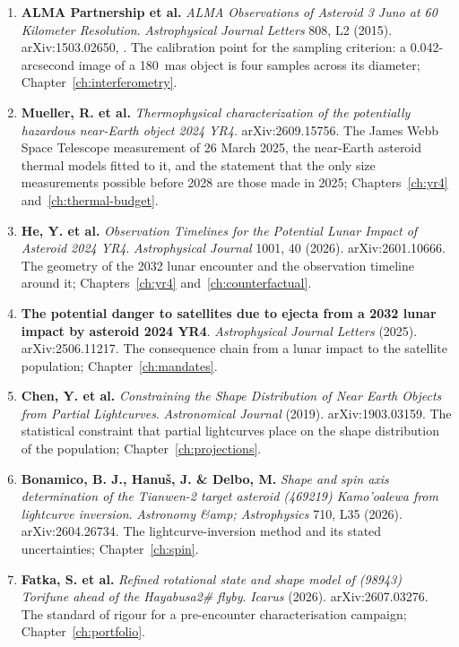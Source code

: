 \begin{enumerate}[leftmargin=2.9em,itemsep=4pt,resume]
\item \textbf{ALMA Partnership et al.} \emph{ALMA Observations of Asteroid
3 Juno at 60 Kilometer Resolution}. \emph{Astrophysical Journal Letters}
808, L2 (2015). arXiv:1503.02650, .
The calibration point for the sampling criterion: a 0.042-arcsecond image
of a 180~mas object is four samples across its diameter; Chapter~\ref{ch:interferometry}.

\item \textbf{Mueller, R. et al.} \emph{Thermophysical characterization of the
potentially hazardous near-Earth object 2024 YR4}. arXiv:2609.15756. The
James Webb Space Telescope measurement of 26 March 2025, the near-Earth
asteroid thermal models fitted to it, and the statement that the only size
measurements possible before 2028 are those made in 2025; Chapters~\ref{ch:yr4}
and~\ref{ch:thermal-budget}.

\item \textbf{He, Y. et al.} \emph{Observation Timelines for the Potential
Lunar Impact of Asteroid 2024 YR4}. \emph{Astrophysical Journal} 1001, 40
(2026). arXiv:2601.10666. The geometry of the 2032 lunar encounter and the
observation timeline around it; Chapters~\ref{ch:yr4} and~\ref{ch:counterfactual}.

\item \textbf{The potential danger to satellites due to ejecta from a 2032
lunar impact by asteroid 2024 YR4}. \emph{Astrophysical Journal Letters}
(2025). arXiv:2506.11217. The consequence chain from a lunar impact to the
satellite population; Chapter~\ref{ch:mandates}.

\item \textbf{Chen, Y. et al.} \emph{Constraining the Shape Distribution of
Near Earth Objects from Partial Lightcurves}. \emph{Astronomical Journal}
(2019). arXiv:1903.03159. The statistical constraint that partial lightcurves
place on the shape distribution of the population; Chapter~\ref{ch:projections}.

\item \textbf{Bonamico, B. J., Hanu\v{s}, J. \& Delbo, M.} \emph{Shape and spin
axis determination of the Tianwen-2 target asteroid (469219)
Kamo'oalewa from lightcurve inversion}. \emph{Astronomy \&amp; Astrophysics}
710, L35 (2026). arXiv:2604.26734. The lightcurve-inversion method and its
stated uncertainties; Chapter~\ref{ch:spin}.

\item \textbf{Fatka, S. et al.} \emph{Refined rotational state and shape model
of (98943) Torifune ahead of the Hayabusa2\# flyby}. \emph{Icarus} (2026).
arXiv:2607.03276. The standard of rigour for a pre-encounter characterisation
campaign; Chapter~\ref{ch:portfolio}.


\end{enumerate}
